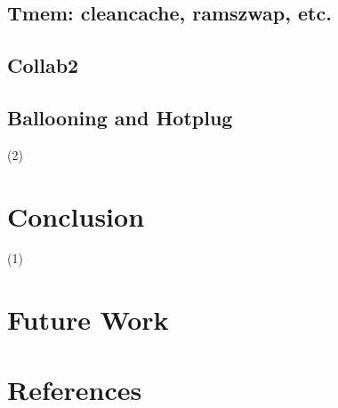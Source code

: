 \documentclass[11pt]{article}
\begin{document}
\subsection{Tmem: cleancache, ramszwap, etc.}
\label{sec-10_2}
\subsection{Collab2}
\label{sec-10_3}
\subsection{Ballooning and Hotplug}
\label{sec-10_4}

   (2)
\section{Conclusion}
\label{sec-11}

   (1)
\section{Future Work}
\label{sec-12}
\section{References}
\label{sec-13}
\end{document}
